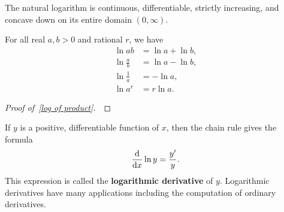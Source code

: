\begin{corollary}
The natural logarithm is continuous, differentiable, strictly increasing, and concave down on its entire domain $(0,\infty)$.
\end{corollary}

\newpage 

\begin{theorem}
For all real $a,b>0$ and rational $r$, we have
\begin{align}
 \ln ab &= \ln a + \ln b,\label{log of product}\\
 \ln\frac{a}{b} &= \ln a - \ln b,\\
 \ln\frac{1}{a} &= -\ln a,\\
 \ln a^r &= r\ln a.
\end{align}
\end{theorem}
\ifdefined\SOLUTION
{}
\else
\begin{proof}[Proof of~\eqref{log of product}]\,

\vspace{6in}
\end{proof}
\fi

\newpage

\begin{remark}
If $y$ is a positive, differentiable function of $x$, then the chain rule gives the formula
\begin{equation*}
\frac{\mathrm{d} }{\mathrm{d} x}\ln y = \frac{y'}{y}.
\end{equation*}
This expression is called the \textbf{logarithmic derivative} of $y$.
Logarithmic derivatives have many applications including the computation of ordinary derivatives.
\end{remark}


